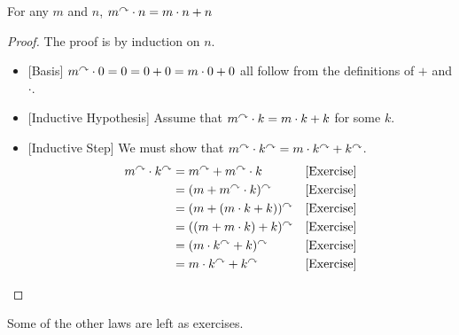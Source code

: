 \ipadbreak

\begin{lem}\label{lem:MultSucc}
  For any $m$ and $n$, $m^\curvearrowright \cdot n = m\cdot n + n$

 \begin{proof}
   The proof is by induction on $n$.
   \begin{itemize}
   \item{}[Basis] $m^\curvearrowright\cdot 0 = 0 = 0+0 = m\cdot 0 + 0$ all follow
     from the definitions of $+$ and $\cdot$.
   \item{}[Inductive Hypothesis] Assume that $m^\curvearrowright\cdot k = m\cdot k +
     k$ for some $k$.
   \item{}[Inductive Step] We must show that $m^\curvearrowright\cdot k^\curvearrowright =
     m\cdot k^\curvearrowright + k^\curvearrowright$.
     \begin{align*}
       m^\curvearrowright\cdot k^\curvearrowright &= m^\curvearrowright + m^\curvearrowright\cdot k &&\text{[Exercise]}\\
       &= (m + m^\curvearrowright\cdot k)^\curvearrowright &&\text{[Exercise]}\\
       &= (m + (m\cdot k + k))^\curvearrowright && \text{[Exercise]}\\
       &= ((m+ m\cdot k) + k)^\curvearrowright &&\text{[Exercise]}\\
       &= (m\cdot k^\curvearrowright + k)^\curvearrowright &&\text{[Exercise]}\\
       &= m\cdot k^\curvearrowright + k^\curvearrowright &&\text{[Exercise]}
     \end{align*}
   \end{itemize}
 \end{proof}
\end{lem}

Some of the other laws are left as exercises.

\printbreak

